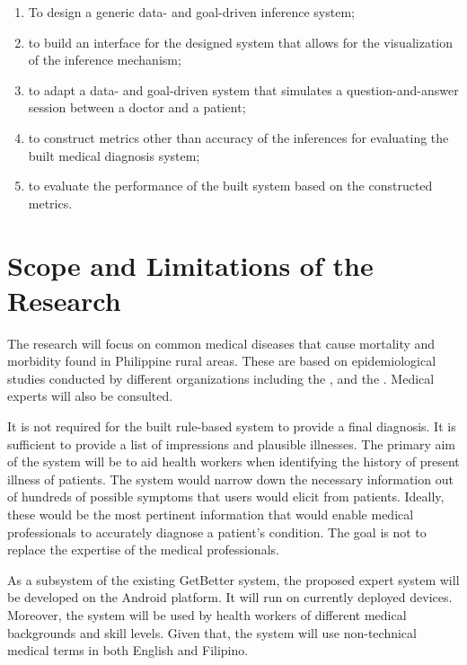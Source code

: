 \begin{enumerate}
	\item To design a generic data- and goal-driven inference system;   
	\item to build an interface for the designed system that allows for the visualization of the inference mechanism;
    \item to adapt a data- and goal-driven system that simulates a question-and-answer session between a doctor and a patient;
    \item to construct metrics other than accuracy of the inferences for evaluating the built medical diagnosis system;
    \item to evaluate the performance of the built system based on the constructed metrics.
\end{enumerate}

\section{Scope and Limitations of the Research}
\label{sec:scopelimitations}

The research will focus on common medical diseases that cause mortality and morbidity found in Philippine rural areas.
These are based on epidemiological studies conducted by different organizations including the , and the .
Medical experts will also be consulted.

It is not required for the built rule-based system to provide a final diagnosis. It is sufficient to provide a list of impressions and plausible illnesses.
The primary aim of the system will be to aid health workers when identifying the history of present illness of patients.
The system would narrow down the necessary information out of hundreds of possible symptoms that users would elicit from patients.
Ideally, these would be the most pertinent information that would enable medical professionals to accurately diagnose a patient's condition.
The goal is not to replace the expertise of the medical professionals.

As a subsystem of the existing GetBetter system, the proposed expert system will be developed on the Android platform.
It will run on currently deployed devices.
Moreover, the system will be used by health workers of different medical backgrounds and skill levels.
Given that, the system will use non-technical medical terms in both English and Filipino.

